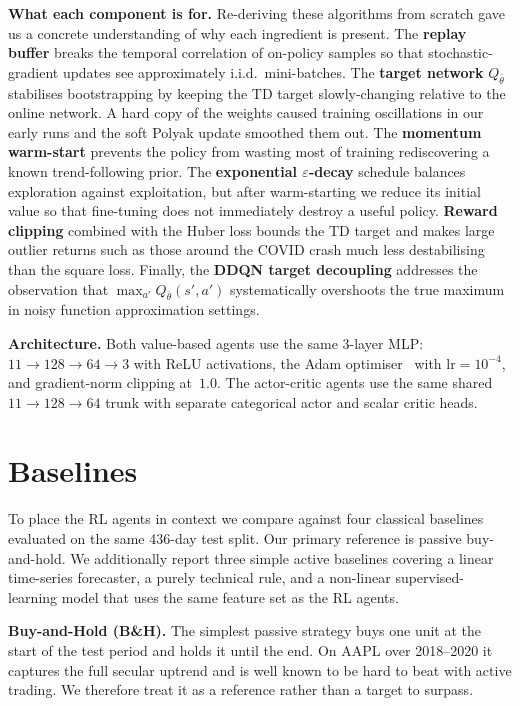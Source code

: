 \documentclass[11pt,twocolumn]{article}
\begin{document}
\textbf{What each component is for.}
Re-deriving these algorithms from scratch gave us a concrete understanding of why each ingredient is present. The \textbf{replay buffer} breaks the temporal correlation of on-policy samples so that stochastic-gradient updates see approximately i.i.d.\ mini-batches. The \textbf{target network} $Q_{\bar\theta}$ stabilises bootstrapping by keeping the TD target slowly-changing relative to the online network. A hard copy of the weights caused training oscillations in our early runs and the soft Polyak update smoothed them out. The \textbf{momentum warm-start} prevents the policy from wasting most of training rediscovering a known trend-following prior. The \textbf{exponential $\varepsilon$-decay} schedule balances exploration against exploitation, but after warm-starting we reduce its initial value so that fine-tuning does not immediately destroy a useful policy. \textbf{Reward clipping} combined with the Huber loss bounds the TD target and makes large outlier returns such as those around the COVID crash much less destabilising than the square loss. Finally, the \textbf{DDQN target decoupling} addresses the observation that $\max_{a'} Q_{\bar\theta}(s',a')$ systematically overshoots the true maximum in noisy function approximation settings.

\textbf{Architecture.}
Both value-based agents use the same 3-layer MLP: $11 \to 128 \to 64 \to 3$ with ReLU activations, the Adam optimiser~\cite{kingma2015} with $\text{lr}=10^{-4}$, and gradient-norm clipping at~$1.0$. The actor-critic agents use the same shared $11 \to 128 \to 64$ trunk with separate categorical actor and scalar critic heads.

\section{Baselines}

To place the RL agents in context we compare against four classical baselines evaluated on the same 436-day test split. Our primary reference is passive buy-and-hold. We additionally report three simple active baselines covering a linear time-series forecaster, a purely technical rule, and a non-linear supervised-learning model that uses the same feature set as the RL agents.

\textbf{Buy-and-Hold (B\&H).}
The simplest passive strategy buys one unit at the start of the test period and holds it until the end. On AAPL over 2018--2020 it captures the full secular uptrend and is well known to be hard to beat with active trading. We therefore treat it as a reference rather than a target to surpass.
\end{document}
